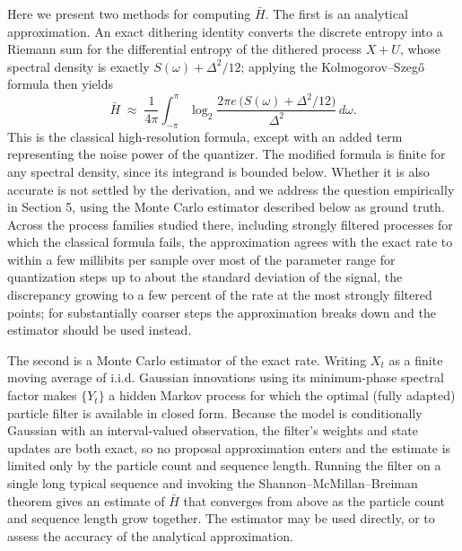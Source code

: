 \documentclass[11pt]{article}
\begin{document}
Here we present two methods for computing \(\bar H\). The first is an analytical approximation. An exact dithering identity converts the discrete entropy into a Riemann sum for the differential entropy of the dithered process \(X + U\), whose spectral density is exactly \(S(\omega) + \Delta^2/12\); applying the Kolmogorov--Szegő formula then yields
\[\bar H \;\approx\; \frac{1}{4\pi}\int_{-\pi}^{\pi}\log_2\frac{2\pi e\,\big(S(\omega)+\Delta^2/12\big)}{\Delta^2}\,d\omega.\]
This is the classical high-resolution formula, except with an added term representing the noise power of the quantizer. The modified formula is finite for any spectral density, since its integrand is bounded below. Whether it is also accurate is not settled by the derivation, and we address the question empirically in Section 5, using the Monte Carlo estimator described below as ground truth. Across the process families studied there, including strongly filtered processes for which the classical formula fails, the approximation agrees with the exact rate to within a few millibits per sample over most of the parameter range for quantization steps up to about the standard deviation of the signal, the discrepancy growing to a few percent of the rate at the most strongly filtered points; for substantially coarser steps the approximation breaks down and the estimator should be used instead.

The second is a Monte Carlo estimator of the exact rate. Writing \(X_t\) as a finite moving average of i.i.d. Gaussian innovations using its minimum-phase spectral factor makes \(\{Y_t\}\) a hidden Markov process for which the optimal (fully adapted) particle filter is available in closed form. Because the model is conditionally Gaussian with an interval-valued observation, the filter's weights and state updates are both exact, so no proposal approximation enters and the estimate is limited only by the particle count and sequence length. Running the filter on a single long typical sequence and invoking the Shannon--McMillan--Breiman theorem gives an estimate of \(\bar H\) that converges from above as the particle count and sequence length grow together. The estimator may be used directly, or to assess the accuracy of the analytical approximation.
\end{document}
